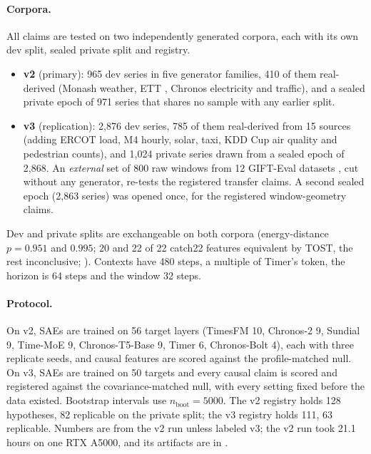 \paragraph{Corpora.} All claims are tested on two independently generated corpora, each with its own dev split, sealed
private split and registry.
\begin{itemize}
  \item \textbf{v2} (primary): 965 dev series in five generator families, 410 of them real-derived (Monash weather, ETT
    \citep{zhou2021informer}, Chronos electricity and traffic), and a sealed private epoch of 971 series that shares no
    sample with any earlier split.
  \item \textbf{v3} (replication): 2{,}876 dev series, 785 of them real-derived from 15 sources (adding ERCOT load, M4
    hourly, solar, taxi, KDD Cup air quality and pedestrian counts), and 1{,}024 private series drawn from a sealed epoch
    of 2{,}868. An \emph{external} set of 800 raw windows from 12 GIFT-Eval datasets \citep{aksu2024gifteval}, cut without
    any generator, re-tests the registered transfer claims. A second sealed epoch (2{,}863 series) was opened once, for
    the registered window-geometry claims.
\end{itemize}
Dev and private splits are exchangeable on both corpora (energy-distance $p=0.951$ and $0.995$; 20 and 22 of 22 catch22
features equivalent by TOST, the rest inconclusive; ). Contexts have 480 steps, a multiple of Timer's token,
the horizon is 64 steps and the window 32 steps.

\paragraph{Protocol.} On v2, SAEs are trained on 56 target layers (TimesFM 10, Chronos-2 9, Sundial 9, Time-MoE 9,
Chronos-T5-Base 9, Timer 6, Chronos-Bolt 4), each with three replicate seeds, and causal features are scored against the
profile-matched null. On v3, SAEs are trained on 50 targets and every causal claim is scored and registered against the
covariance-matched null, with every setting fixed before the data existed. Bootstrap intervals use
$n_{\text{boot}}=5000$. The v2 registry holds 128 hypotheses, 82 replicable on the private split; the v3 registry holds
111, 63 replicable. Numbers are from the v2 run unless labeled v3; the v2 run took 21.1 hours on one RTX A5000, and its
artifacts are in .

